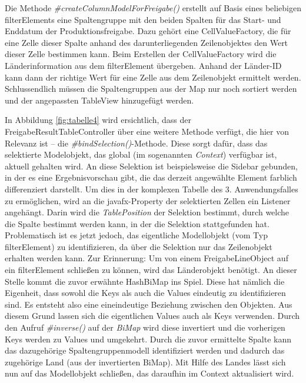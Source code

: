 Die Methode \textit{\#createColumnModelForFreigabe() }erstellt auf Basis eines beliebigen \gls{filterElement}s eine Spaltengruppe mit den beiden Spalten für das Start- und Enddatum der Produktionsfreigabe. Dazu gehört eine CellValueFactory, die für eine Zelle dieser Spalte anhand des darunterliegenden Zeilenobjektes den Wert dieser Zelle bestimmen kann. Beim Erstellen der CellValueFactory wird die Länderinformation aus dem \gls{filterElement} übergeben. Anhand der Länder-ID kann dann der richtige Wert für eine Zelle aus dem Zeilenobjekt ermittelt werden. Schlussendlich müssen die Spaltengruppen aus der Map nur noch sortiert werden und der angepassten TableView hinzugefügt werden.

In Abbildung \ref{fig:tabelle4} wird ersichtlich, dass der FreigabeResultTableController über eine weitere Methode verfügt, die hier von Relevanz ist – die \textit{\#bindSelection()}-Methode. Diese sorgt dafür, dass das selektierte Modelobjekt, das global (im sogenannten \textit{Context}) verfügbar ist, aktuell gehalten wird. An diese Selektion ist beispielsweise die Sidebar gebunden, in der es eine Ergebnisvorschau gibt, die das derzeit angewählte Element farblich differenziert darstellt. Um dies in der komplexen Tabelle des 3. Anwendungsfalles zu ermöglichen, wird an die \gls{javafx}-Property der selektierten Zellen ein Listener angehängt. Darin wird die \textit{TablePosition} der Selektion bestimmt, durch welche die Spalte bestimmt werden kann, in der die Selektion stattgefunden hat. Problematisch ist es jetzt jedoch, das eigentliche Modellobjekt (vom Typ \gls{filterElement}) zu identifizieren, da über die Selektion nur das Zeilenobjekt erhalten werden kann. Zur Erinnerung: Um von einem FreigabeLineObject auf ein \gls{filterElement} schließen zu können, wird das Länderobjekt benötigt. An dieser Stelle kommt die zuvor erwähnte HashBiMap ins Spiel. Diese hat nämlich die Eigenheit, dass sowohl die Keys als auch die Values eindeutig zu identifizieren sind. Es entsteht also eine eineindeutige Beziehung zwischen den Objekten. Aus diesem Grund lassen sich die eigentlichen Values auch als Keys verwenden. Durch den Aufruf \textit{\#inverse()} auf der \textit{BiMap} wird diese invertiert und die vorherigen Keys werden zu Values und umgekehrt. Durch die zuvor ermittelte Spalte kann das dazugehörige Spaltengruppenmodell identifiziert werden und dadurch das zugehörige Land (aus der invertierten BiMap). Mit Hilfe des Landes lässt sich nun auf das Modellobjekt schließen, das daraufhin im Context aktualisiert wird.

